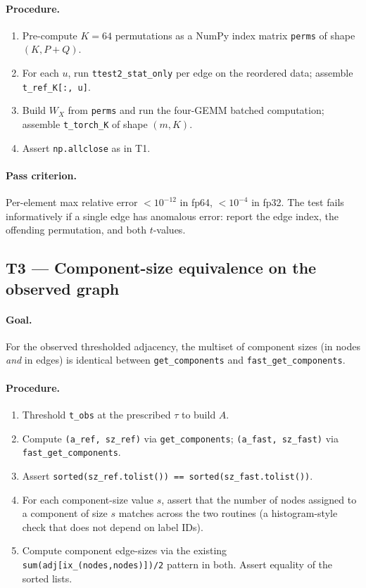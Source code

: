 \documentclass[11pt]{article}
\begin{document}
\paragraph{Procedure.}
\begin{enumerate}[leftmargin=2.0em]
\item Pre-compute $K=64$ permutations as a NumPy index matrix \texttt{perms} of shape $(K, P+Q)$.
\item For each $u$, run \texttt{ttest2\_stat\_only} per edge on the reordered data; assemble \texttt{t\_ref\_K[:, u]}.
\item Build $W_X$ from \texttt{perms} and run the four-GEMM batched computation; assemble \texttt{t\_torch\_K} of shape $(m, K)$.
\item Assert \texttt{np.allclose} as in T1.
\end{enumerate}

\paragraph{Pass criterion.} Per-element max relative error $< 10^{-12}$ in fp64, $< 10^{-4}$ in fp32. The test fails informatively if a single edge has anomalous error: report the edge index, the offending permutation, and both $t$-values.

\subsection{T3 --- Component-size equivalence on the observed graph}

\paragraph{Goal.} For the observed thresholded adjacency, the multiset of component sizes (in nodes \emph{and} in edges) is identical between \texttt{get\_components} and \texttt{fast\_get\_components}.

\paragraph{Procedure.}
\begin{enumerate}[leftmargin=2.0em]
\item Threshold \texttt{t\_obs} at the prescribed $\tau$ to build $A$.
\item Compute \texttt{(a\_ref, sz\_ref)} via \texttt{get\_components}; \texttt{(a\_fast, sz\_fast)} via \texttt{fast\_get\_components}.
\item Assert \texttt{sorted(sz\_ref.tolist()) == sorted(sz\_fast.tolist())}.
\item For each component-size value $s$, assert that the number of nodes assigned to a component of size $s$ matches across the two routines (a histogram-style check that does not depend on label IDs).
\item Compute component edge-sizes via the existing \texttt{sum(adj[ix\_(nodes,nodes)])/2} pattern in both. Assert equality of the sorted lists.
\end{enumerate}
\end{document}
